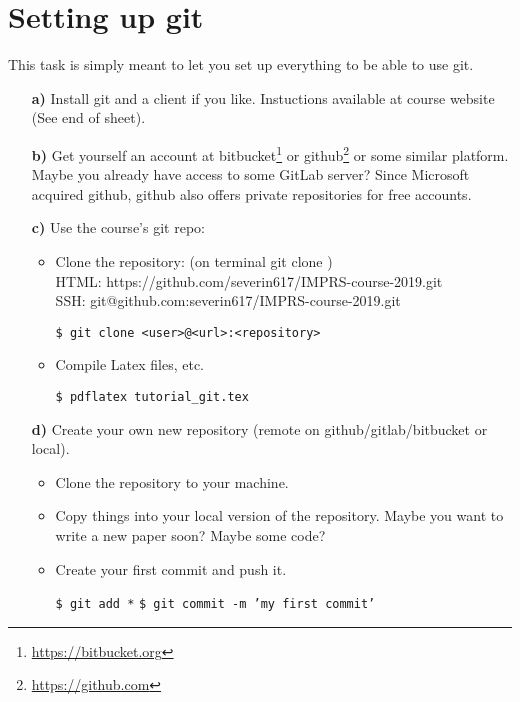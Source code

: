 \documentclass[11pt]{article}
\begin{document}
\section*{Setting up git}
This task is simply meant to let you set up everything to be able to use git. 
\begin{itemize}
	\item[\bf{a)}] Install git and a client if you like. Instuctions available at course website (See end of sheet).%
	\item[\bf{b)}] Get yourself an account at bitbucket\footnote{\url{https://bitbucket.org}} or github\footnote{\url{https://github.com}} or some similar platform. Maybe you already have access to some GitLab server? Since Microsoft acquired github, github also offers private repositories for free accounts.
	\item[\bf{c)}] Use the course's git repo:
	\begin{itemize}
		\item Clone the repository: (on terminal git clone )\\ 
		HTML: https://github.com/severin617/IMPRS-course-2019.git \\
		SSH: git@github.com:severin617/IMPRS-course-2019.git
		\begin{framed}
			\texttt{\$ git clone <user>@<url>:<repository>}
		\end{framed}
		\item Compile Latex files, etc.
		\begin{framed}
			\texttt{\$ pdflatex tutorial\_git.tex}
		\end{framed}
	\end{itemize}
	\item[\bf{d)}] Create your own new repository (remote on github/gitlab/bitbucket or local).
	\begin{itemize}
		\item Clone the repository to your machine.
		\item Copy things into your local version of the repository. Maybe you want to write a new paper soon? Maybe some code?
		\item Create your first commit and push it.
		\begin{framed}
			\texttt{\$ git add *} \newline
			\texttt{\$ git commit -m 'my first commit'}
		\end{framed}
	\end{itemize}
\end{itemize}
\end{document}
